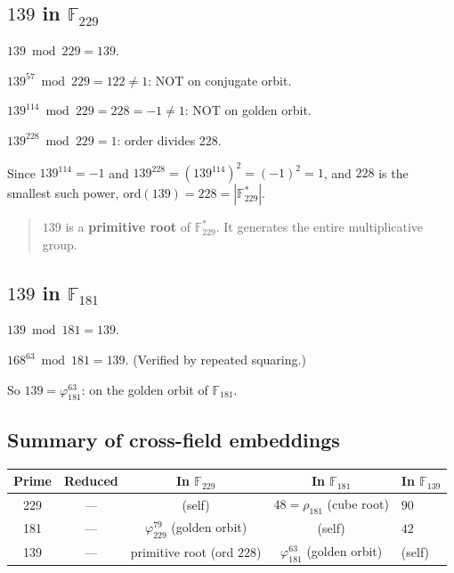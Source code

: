 \subsection{$139$ in $\mathbb{F}_{229}$}

$139 \bmod 229 = 139$.

$139^{57} \bmod 229 = 122 \neq 1$: NOT on conjugate orbit.

$139^{114} \bmod 229 = 228 = -1 \neq 1$: NOT on golden orbit.

$139^{228} \bmod 229 = 1$: order divides 228.

Since $139^{114} = -1$ and $139^{228} = (139^{114})^2 = (-1)^2 = 1$,
and $228$ is the smallest such power, $\mathrm{ord}(139) = 228 = |\mathbb{F}_{229}^*|$.

\begin{quote}
$139$ is a \textbf{primitive root} of $\mathbb{F}_{229}^*$.
It generates the entire multiplicative group.
\end{quote}

\subsection{$139$ in $\mathbb{F}_{181}$}

$139 \bmod 181 = 139$.

$168^{63} \bmod 181 = 139$. (Verified by repeated squaring.)

So $139 = \varphi_{181}^{63}$: on the golden orbit of $\mathbb{F}_{181}$.

\subsection{Summary of cross-field embeddings}

\begin{center}
\begin{tabular}{@{}ccccl@{}}
\toprule
Prime & Reduced & In $\mathbb{F}_{229}$ & In $\mathbb{F}_{181}$ & In $\mathbb{F}_{139}$ \\
\midrule
229 & --- & (self) & $48 = \rho_{181}$ (cube root) & $90$ \\
181 & --- & $\varphi_{229}^{79}$ (golden orbit) & (self) & $42$ \\
139 & --- & primitive root (ord $228$) & $\varphi_{181}^{63}$ (golden orbit) & (self) \\
\bottomrule
\end{tabular}
\end{center}

